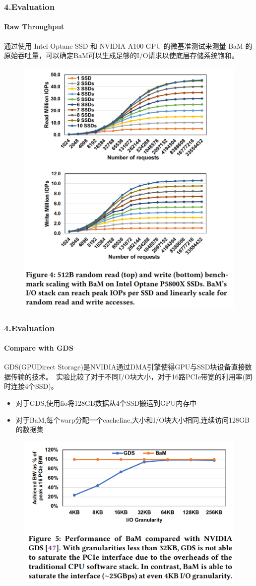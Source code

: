\documentclass[10pt]{ctexbeamer}
\begin{document}
\begin{frame}
  \frametitle{4.Evaluation}
  \framesubtitle{Raw Throughput}
  通过使用 Intel Optane SSD 和 NVIDIA A100 GPU 的微基准测试来测量 BaM 的原始吞吐量，可以确定BaM可以生成足够的I/O请求以使底层存储系统饱和。
  
  \begin{figure}
    \centering
    \includegraphics[width=.5\textwidth, height=.8\textheight, keepaspectratio]{images/iops.png}
  \end{figure}
\end{frame}


\begin{frame}
  \frametitle{4.Evaluation}
  \framesubtitle{Compare with GDS}
  GDS(GPUDirect Storage)是NVIDIA通过DMA引擎使得GPU与SSD块设备直接数据传输的技术。\
  实验比较了对于不同I/O块大小，对于16路PCIe带宽的利用率(同时连接4个SSD)。
  \begin{itemize}
    \item 对于GDS,使用fio将128GB数据从4个SSD搬运到GPU内存中
    \item 对于BaM,每个warp分配一个cacheline,大小和I/O块大小相同,连续访问128GB的数据集
  \end{itemize}
  \begin{figure}
    \includegraphics[width=.4\textwidth,height=.4\textheight]{images/gds.png}
  \end{figure}

\end{frame}
\end{document}
